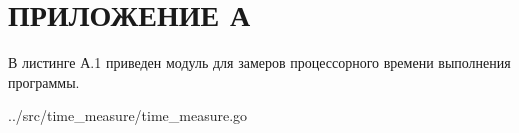 \chapter*{ПРИЛОЖЕНИЕ А}

В листинге А.1 приведен модуль для замеров процессорного времени выполнения программы.
\captionsetup[lstlisting]{format=leftalign, labelformat=mylabelformat1, labelsep=none}
\begin{lstinputlisting}[
	caption={Измерение времени},
	label={lst:time},
	style={go},
	]{../src/time\_measure/time\_measure.go}
\end{lstinputlisting}